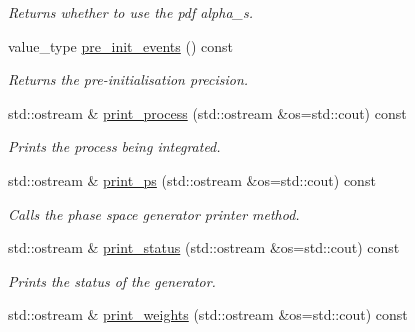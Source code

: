 \begin{DoxyCompactItemize}
\begin{DoxyCompactList}\small\item\em Returns whether to use the pdf alpha\-\_\-s. \end{DoxyCompactList}\item 
\hypertarget{a00430_a6c4f0ad8650bce3fcb71edaf36e9d641}{value\-\_\-type \hyperlink{a00430_a6c4f0ad8650bce3fcb71edaf36e9d641}{pre\-\_\-init\-\_\-events} () const }\label{a00430_a6c4f0ad8650bce3fcb71edaf36e9d641}

\begin{DoxyCompactList}\small\item\em Returns the pre-\/initialisation precision. \end{DoxyCompactList}\item 
\hypertarget{a00430_aa4098eeba2b0f5b50d53b3dfac9eb0a0}{std\-::ostream \& \hyperlink{a00430_aa4098eeba2b0f5b50d53b3dfac9eb0a0}{print\-\_\-process} (std\-::ostream \&os=std\-::cout) const }\label{a00430_aa4098eeba2b0f5b50d53b3dfac9eb0a0}

\begin{DoxyCompactList}\small\item\em Prints the process being integrated. \end{DoxyCompactList}\item 
\hypertarget{a00430_a7d1941d4bacdacd4ee642919a8cf12d9}{std\-::ostream \& \hyperlink{a00430_a7d1941d4bacdacd4ee642919a8cf12d9}{print\-\_\-ps} (std\-::ostream \&os=std\-::cout) const }\label{a00430_a7d1941d4bacdacd4ee642919a8cf12d9}

\begin{DoxyCompactList}\small\item\em Calls the phase space generator printer method. \end{DoxyCompactList}\item 
\hypertarget{a00430_a1f20b9aabbfaa47a6594eb28cf9164b5}{std\-::ostream \& \hyperlink{a00430_a1f20b9aabbfaa47a6594eb28cf9164b5}{print\-\_\-status} (std\-::ostream \&os=std\-::cout) const }\label{a00430_a1f20b9aabbfaa47a6594eb28cf9164b5}

\begin{DoxyCompactList}\small\item\em Prints the status of the generator. \end{DoxyCompactList}\item 
\hypertarget{a00430_ac35a8c16fd72c4c6c38b6a44e75da07c}{std\-::ostream \& \hyperlink{a00430_ac35a8c16fd72c4c6c38b6a44e75da07c}{print\-\_\-weights} (std\-::ostream \&os=std\-::cout) const }\label{a00430_ac35a8c16fd72c4c6c38b6a44e75da07c}


\end{DoxyCompactItemize}
